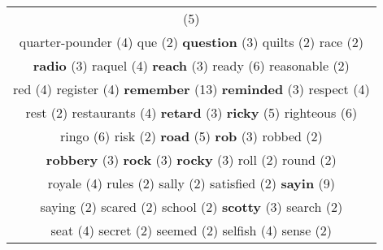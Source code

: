 \documentclass[12pt,a4paper]{article}
\begin{document}
\begin{center}
\begin{longtable}{|c|}
\footnotesize{(5)}  \\ {\normalsize \textcolor{VerdeLocao} {quarter-pounder}} \footnotesize{(4)} {\footnotesize \textcolor{Verde} {que}} \footnotesize{(2)} {\small \textcolor{Laranja} {\bf question}} \footnotesize{(3)} {\footnotesize \textcolor{Verde} {quilts}} \footnotesize{(2)} {\footnotesize \textcolor{Verde} {race}} \footnotesize{(2)}  \\ {\small \textcolor{Laranja} {\bf radio}} \footnotesize{(3)} {\normalsize \textcolor{VerdeLocao} {raquel}} \footnotesize{(4)} {\small \textcolor{Laranja} {\bf reach}} \footnotesize{(3)} {\Large \textcolor{VermEscuro} {ready}} \footnotesize{(6)} {\footnotesize \textcolor{Verde} {reasonable}} \footnotesize{(2)}  \\ {\normalsize \textcolor{VerdeLocao} {red}} \footnotesize{(4)} {\normalsize \textcolor{VerdeLocao} {register}} \footnotesize{(4)} {\Huge \textcolor{AzulEscuro} {\bf remember}} \footnotesize{(13)} {\small \textcolor{Laranja} {\bf reminded}} \footnotesize{(3)} {\normalsize \textcolor{VerdeLocao} {respect}} \footnotesize{(4)}  \\ {\footnotesize \textcolor{Verde} {rest}} \footnotesize{(2)} {\normalsize \textcolor{VerdeLocao} {restaurants}} \footnotesize{(4)} {\small \textcolor{Laranja} {\bf retard}} \footnotesize{(3)} {\large \textcolor{Roxo} {\bf ricky}} \footnotesize{(5)} {\Large \textcolor{VermEscuro} {righteous}} \footnotesize{(6)}  \\ {\Large \textcolor{VermEscuro} {ringo}} \footnotesize{(6)} {\footnotesize \textcolor{Verde} {risk}} \footnotesize{(2)} {\large \textcolor{Roxo} {\bf road}} \footnotesize{(5)} {\small \textcolor{Laranja} {\bf rob}} \footnotesize{(3)} {\footnotesize \textcolor{Verde} {robbed}} \footnotesize{(2)}  \\ {\small \textcolor{Laranja} {\bf robbery}} \footnotesize{(3)} {\small \textcolor{Laranja} {\bf rock}} \footnotesize{(3)} {\small \textcolor{Laranja} {\bf rocky}} \footnotesize{(3)} {\footnotesize \textcolor{Verde} {roll}} \footnotesize{(2)} {\footnotesize \textcolor{Verde} {round}} \footnotesize{(2)}  \\ {\normalsize \textcolor{VerdeLocao} {royale}} \footnotesize{(4)} {\footnotesize \textcolor{Verde} {rules}} \footnotesize{(2)} {\footnotesize \textcolor{Verde} {sally}} \footnotesize{(2)} {\footnotesize \textcolor{Verde} {satisfied}} \footnotesize{(2)} {\Huge \textcolor{AzulEscuro} {\bf sayin}} \footnotesize{(9)}  \\ {\footnotesize \textcolor{Verde} {saying}} \footnotesize{(2)} {\footnotesize \textcolor{Verde} {scared}} \footnotesize{(2)} {\footnotesize \textcolor{Verde} {school}} \footnotesize{(2)} {\small \textcolor{Laranja} {\bf scotty}} \footnotesize{(3)} {\footnotesize \textcolor{Verde} {search}} \footnotesize{(2)}  \\ {\normalsize \textcolor{VerdeLocao} {seat}} \footnotesize{(4)} {\footnotesize \textcolor{Verde} {secret}} \footnotesize{(2)} {\footnotesize \textcolor{Verde} {seemed}} \footnotesize{(2)} {\normalsize \textcolor{VerdeLocao} {selfish}} \footnotesize{(4)} {\footnotesize \textcolor{Verde} {sense}} \footnotesize{(2)}  \\ 
\end{longtable}
\end{center}
\end{document}

